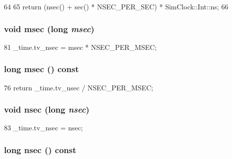 \begin{DoxyCode}
64 {
65     return (nsec() + sec() * NSEC_PER_SEC) * SimClock::Int::ns;
66 }
\end{DoxyCode}
\hypertarget{classTime_abe86a418b3cf42a34b2ad6327bcff7fb}{
\subsubsection[{msec}]{\setlength{\rightskip}{0pt plus 5cm}void msec (long {\em msec})}}
\label{classTime_abe86a418b3cf42a34b2ad6327bcff7fb}



\begin{DoxyCode}
81 { _time.tv_nsec = msec * NSEC_PER_MSEC; }
\end{DoxyCode}
\hypertarget{classTime_ae5ccea767592fcd6015b6a88de043382}{
\subsubsection[{msec}]{\setlength{\rightskip}{0pt plus 5cm}long msec () const}}
\label{classTime_ae5ccea767592fcd6015b6a88de043382}



\begin{DoxyCode}
76 { return _time.tv_nsec / NSEC_PER_MSEC; }
\end{DoxyCode}
\hypertarget{classTime_abf9aa5d6ba2a904a41528f39c0c91739}{
\subsubsection[{nsec}]{\setlength{\rightskip}{0pt plus 5cm}void nsec (long {\em nsec})}}
\label{classTime_abf9aa5d6ba2a904a41528f39c0c91739}



\begin{DoxyCode}
83 { _time.tv_nsec = nsec; }
\end{DoxyCode}
\hypertarget{classTime_a6688edbe52e72fa72a16651457dfc2b3}{
\subsubsection[{nsec}]{\setlength{\rightskip}{0pt plus 5cm}long nsec () const}}
\label{classTime_a6688edbe52e72fa72a16651457dfc2b3}



